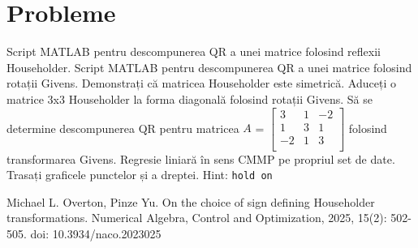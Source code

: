 \documentclass{exam}
\begin{document}
\section{Probleme}

\begin{questions}
	\boxedpoints
	\pointsinmargin

	\question Script MATLAB pentru descompunerea QR a unei matrice folosind reflexii Householder.
	\question Script MATLAB pentru descompunerea QR a unei matrice folosind rotații Givens.
	\question Demonstrați că matricea Householder este simetrică.
	\question Aduceți o matrice 3x3 Householder la forma diagonală folosind
	rotații Givens.
	\question Să se determine descompunerea QR pentru matricea
	$A$ = $\begin{bmatrix}
			3  & 1 & -2 \\
			1  & 3 & 1  \\
			-2 & 1 & 3  \\
		\end{bmatrix}$ folosind transformarea Givens.
	\question Regresie liniară în sens CMMP pe propriul set de date. Trasați
	graficele punctelor și a dreptei. Hint: \verb|hold on|
\end{questions}

\begin{thebibliography}{1}

	Michael L. Overton, Pinze Yu. On the choice of sign defining Householder transformations. Numerical Algebra, Control and Optimization, 2025, 15(2): 502-505. doi: 10.3934/naco.2023025

\end{thebibliography}
\end{document}
